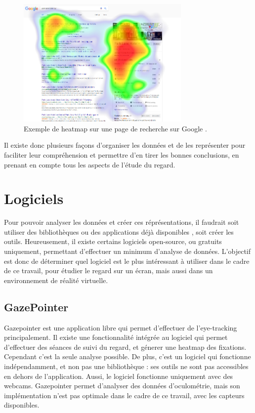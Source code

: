\documentclass[hidelinks,12pt]{article}
\begin{document}
\begin{figure}[htpb]
  \centering
  \includegraphics[width=0.75\textwidth,keepaspectratio=true]{heatmap.png}
  \caption{Exemple de heatmap sur une page de recherche sur Google
    \cite{img_heatmap}.}
  \label{fig:heatmap}
\end{figure}

\bigskip
Il existe donc plusieurs façons d'organiser les données et de les représenter
pour faciliter leur compréhension et permettre d'en tirer les bonnes
conclusions, en prenant en compte tous les aspects de l'étude du regard.


\section{Logiciels}

Pour pouvoir analyser les données et créer ces réprésentations, il faudrait soit
utiliser des bibliothèques ou des applications déjà disponibles
\cite{imotions_software}, soit créer les outils. Heureusement, il existe
certains logiciels open-source, ou gratuits uniquement, permettant d'effectuer
un minimum d'analyse de données. L'objectif est donc de déterminer quel
logiciel est le plus intéressant à utiliser dans le cadre de ce travail,
pour étudier le regard sur un écran, mais aussi dans un environnement de
réalité virtuelle.

\subsection{GazePointer}

Gazepointer \cite{gazepointer} est une application libre qui permet d'effectuer
de l'eye-tracking principalement. Il existe une fonctionnalité intégrée au
logiciel qui permet d'effectuer des séances de suivi du regard, et génerer une
heatmap des fixations. Cependant c'est la seule analyse possible. De plus,
c'est un logiciel qui fonctionne indépendamment, et non pas une bibliothèque :
ses outils ne sont pas accessibles en dehors de l'application. Aussi, le
logiciel fonctionne uniquement avec des webcams. Gazepointer permet d'analyser
des données d'oculométrie, mais son implémentation n'est pas optimale dans le
cadre de ce travail, avec les capteurs disponibles.
\end{document}
